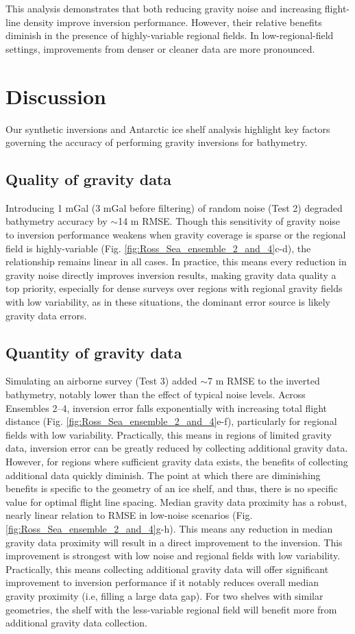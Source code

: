 \documentclass[tc, manuscript]{copernicus}
\begin{document}
This analysis demonstrates that both reducing gravity noise and increasing flight-line density improve inversion performance. However, their relative benefits diminish in the presence of highly-variable regional fields. In low-regional-field settings, improvements from denser or cleaner data are more pronounced.

\section{Discussion}

Our synthetic inversions and Antarctic ice shelf analysis highlight key factors governing the accuracy of performing gravity inversions for bathymetry.

\subsection{Quality of gravity data}
Introducing 1 mGal (3 mGal before filtering) of random noise (Test 2) degraded bathymetry accuracy by $\sim$14 m RMSE. Though this sensitivity of gravity noise to inversion performance weakens when gravity coverage is sparse or the regional field is highly-variable (Fig. \ref{fig:Ross_Sea_ensemble_2_and_4}c-d), the relationship remains linear in all cases. In practice, this means every reduction in gravity noise directly improves inversion results, making gravity data quality a top priority, especially for dense surveys over regions with regional gravity fields with low variability, as in these situations, the dominant error source is likely gravity data errors.

\subsection{Quantity of gravity data}
Simulating an airborne survey (Test 3) added $\sim$7 m RMSE to the inverted bathymetry, notably lower than the effect of typical noise levels. Across Ensembles 2–4, inversion error falls exponentially with increasing total flight distance (Fig. \ref{fig:Ross_Sea_ensemble_2_and_4}e-f), particularly for regional fields with low variability. Practically, this means in regions of limited gravity data, inversion error can be greatly reduced by collecting additional gravity data. However, for regions where sufficient gravity data exists, the benefits of collecting additional data quickly diminish. The point at which there are diminishing benefits is specific to the geometry of an ice shelf, and thus, there is no specific value for optimal flight line spacing. Median gravity data proximity has a robust, nearly linear relation to RMSE in low-noise scenarios (Fig. \ref{fig:Ross_Sea_ensemble_2_and_4}g-h). This means any reduction in median gravity data proximity will result in a direct improvement to the inversion. This improvement is strongest with low noise and regional fields with low variability. Practically, this means collecting additional gravity data will offer significant improvement to inversion performance if it notably reduces overall median gravity proximity (i.e, filling a large data gap). For two shelves with similar geometries, the shelf with the less-variable regional field will benefit more from additional gravity data collection.
\end{document}
